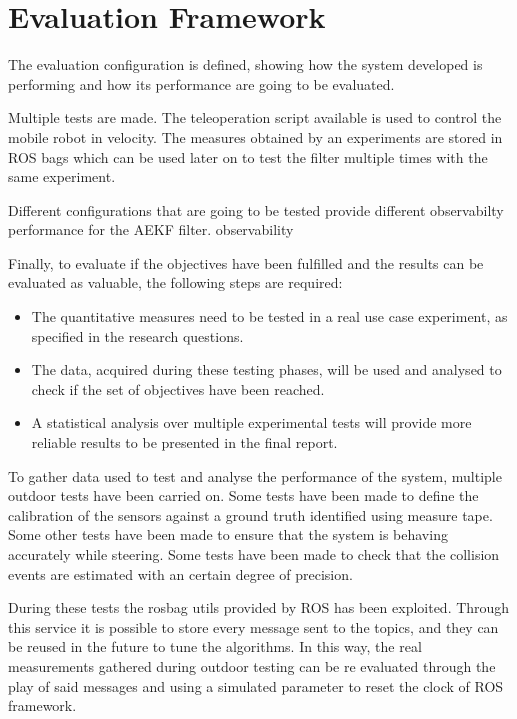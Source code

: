 \section{Evaluation Framework}

\label{sec:testing}

\noindent 
The evaluation configuration is defined, showing how the system developed is performing and how its performance are going to be evaluated.

Multiple tests are made.
The teleoperation script available is used to control the mobile robot in velocity.
The measures obtained by an experiments are stored in \gls{ROS} bags which can be used later on to test the filter multiple times with the same experiment.

Different configurations that are going to be tested provide different observabilty performance for the AEKF filter.
observability



Finally, to evaluate if the objectives have been fulfilled and the results can be evaluated as valuable, the following steps are required:
\begin{itemize}
	\item The quantitative measures need to be tested in a real use case experiment, as specified in the research questions.
	\item The data, acquired during these testing phases, will be used and analysed to check if the set of objectives have been reached.
	\item A statistical analysis over multiple experimental tests will provide more reliable results to be presented in the final report.
\end{itemize}


To gather data used to test and analyse the performance of the system, multiple outdoor tests have been carried on.
Some tests have been made to define the calibration of the sensors against a ground truth identified using measure tape.
Some other tests have been made to ensure that the system is behaving accurately while steering.
Some tests have been made to check that the collision events are estimated with an certain degree of precision.

During these tests the rosbag utils provided by ROS has been exploited. Through this service it is possible to store every message sent to the topics, and they can be reused in the future to tune the algorithms.
In this way, the real measurements gathered during outdoor testing can be re evaluated through the play of said messages and using a simulated parameter to reset the clock of ROS framework.



